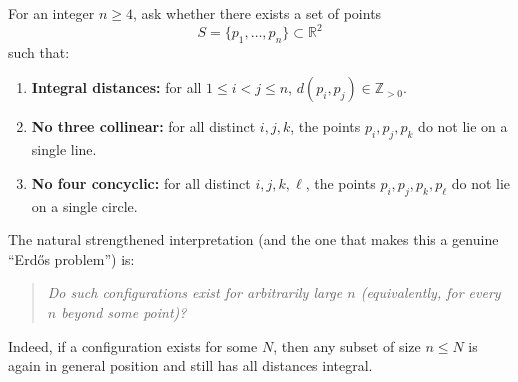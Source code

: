 For an integer $n\ge 4$, ask whether there exists a set of points
\[S=\{p_1,\dots,p_n\}\subset\mathbb{R}^2\]
such that:
\begin{enumerate}
  \item \textbf{Integral distances:} for all $1\le i<j\le n$, $d(p_i,p_j)\in\mathbb{Z}_{>0}$.
  \item \textbf{No three collinear:} for all distinct $i,j,k$, the points $p_i,p_j,p_k$ do not lie on a single line.
  \item \textbf{No four concyclic:} for all distinct $i,j,k,\ell$, the points $p_i,p_j,p_k,p_\ell$ do not lie on a single circle.
\end{enumerate}
The natural strengthened interpretation (and the one that makes this a genuine ``Erd\H{o}s problem'') is:
\begin{quote}
\emph{Do such configurations exist for arbitrarily large $n$ (equivalently, for every $n$ beyond some point)?}
\end{quote}
Indeed, if a configuration exists for some $N$, then any subset of size $n\le N$ is again in general position and still has all distances integral.
